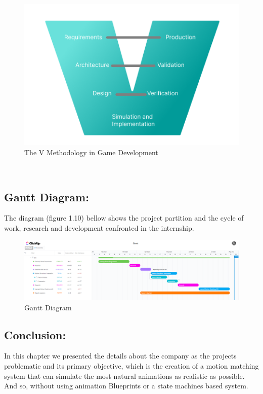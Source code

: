 \documentclass[12pt]{book}
\begin{document}
\begin{figure}[!h]
    \centering
    \includegraphics[scale=0.9]{./Figures/V Dev.png}
    \caption{The V Methodology in Game Development}
    \label{The V Methodology in Game Development}
\end{figure}\\

\subsection{Gantt Diagram:}
The diagram (figure 1.10) bellow shows the project partition and the cycle of work, research and development confronted in the internship.
\begin{figure}
    \centering
    \includegraphics[scale=0.4]{./Figures/Images/gantt.png}
    \caption{Gantt Diagram}
    \label{Gantt Diagram}
\end{figure}

\subsection{Conclusion:}
In this chapter we presented the details about the company as the projects problematic and its primary objective, which is the creation of a motion matching system that can simulate the most natural animations as realistic as possible. And so, without using animation Blueprints or a state machines based system.    
\end{document}
